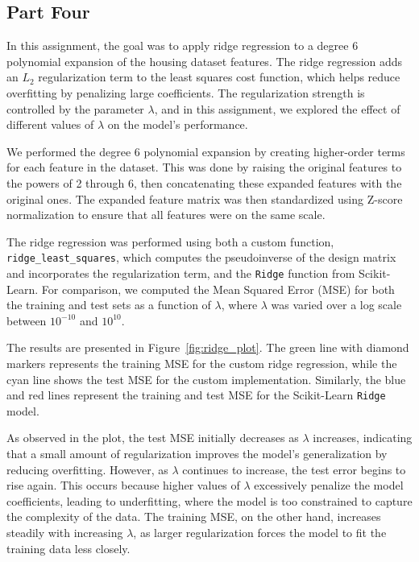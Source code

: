 \documentclass{article}
\begin{document}
\FloatBarrier



\subsection{Part Four}

In this assignment, the goal was to apply ridge regression to a degree 6 polynomial expansion of the housing dataset features. The ridge regression adds an $L_2$ regularization term to the least squares cost function, which helps reduce overfitting by penalizing large coefficients. The regularization strength is controlled by the parameter $\lambda$, and in this assignment, we explored the effect of different values of $\lambda$ on the model's performance.

We performed the degree 6 polynomial expansion by creating higher-order terms for each feature in the dataset. This was done by raising the original features to the powers of 2 through 6, then concatenating these expanded features with the original ones. The expanded feature matrix was then standardized using Z-score normalization to ensure that all features were on the same scale.

The ridge regression was performed using both a custom function, \texttt{ridge\_least\_squares}, which computes the pseudoinverse of the design matrix and incorporates the regularization term, and the \texttt{Ridge} function from Scikit-Learn. For comparison, we computed the Mean Squared Error (MSE) for both the training and test sets as a function of $\lambda$, where $\lambda$ was varied over a log scale between $10^{-10}$ and $10^{10}$.

The results are presented in Figure~\ref{fig:ridge_plot}. The green line with diamond markers represents the training MSE for the custom ridge regression, while the cyan line shows the test MSE for the custom implementation. Similarly, the blue and red lines represent the training and test MSE for the Scikit-Learn \texttt{Ridge} model.

As observed in the plot, the test MSE initially decreases as $\lambda$ increases, indicating that a small amount of regularization improves the model's generalization by reducing overfitting. However, as $\lambda$ continues to increase, the test error begins to rise again. This occurs because higher values of $\lambda$ excessively penalize the model coefficients, leading to underfitting, where the model is too constrained to capture the complexity of the data. The training MSE, on the other hand, increases steadily with increasing $\lambda$, as larger regularization forces the model to fit the training data less closely.
\end{document}
